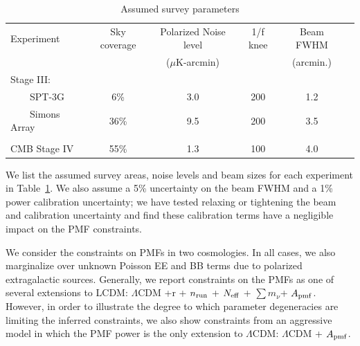 \documentclass[preprint]{emulateapj}
\newcommand{\apmf}{\ensuremath{A_{\rm pmf}}}
\newcommand{\lcdm}{\ensuremath{\Lambda}CDM}
\newcommand{\nrun}{\ensuremath{n_{\rm run}}}
\newcommand{\neff}{\ensuremath{N_{\rm eff}}}
\newcommand{\mnu}{\ensuremath{\sum m_\nu}}
\newcommand{\tbd}[1]{\textcolor{Red}{{\bf TBD}: #1}}
\begin{document}
\begin{table}[tbh]
\begin{center}
\caption{\label{tab:experiments} Assumed survey parameters}
\small
\begin{tabular}{l || c c c c c }
Experiment & Sky coverage & Polarized Noise level  & 1/f knee & Beam FWHM \\
& &($\mu$K-arcmin)&&(arcmin.)\\
\hline
Stage III: & & & & \\

~~~~SPT-3G & 6\% & 3.0 & 200 & 1.2 \\
~~~~Simons Array & 36\% & 9.5 & 200 & 3.5 \\ 
\\
CMB Stage IV & 55\% & 1.3 & 100 & 4.0 \\
\end{tabular}
 \normalsize
\end{center}
\end{table}


We list the assumed survey areas, noise levels and beam sizes for each experiment in Table~\ref{tab:experiments}. 
We also assume a 5\% uncertainty on the beam FWHM and a 1\% power calibration uncertainty; we have tested relaxing or tightening the beam and calibration uncertainty and find these calibration terms have a negligible impact on the PMF constraints. 


We consider the constraints on PMFs in two cosmologies. 
In all cases, we also marginalize over unknown Poisson EE and BB  terms due to polarized extragalactic sources. 
Generally, we report constraints on the PMFs as one of several extensions to LCDM:  \lcdm{}  +r + \nrun{} + \neff{} + \mnu{}+ \apmf. 
However, in order to illustrate the degree to which parameter degeneracies are limiting the inferred constraints,  we also show constraints from an aggressive model in which the PMF power is the only extension to \lcdm{}:  \lcdm{}  + \apmf. 

\end{document}
